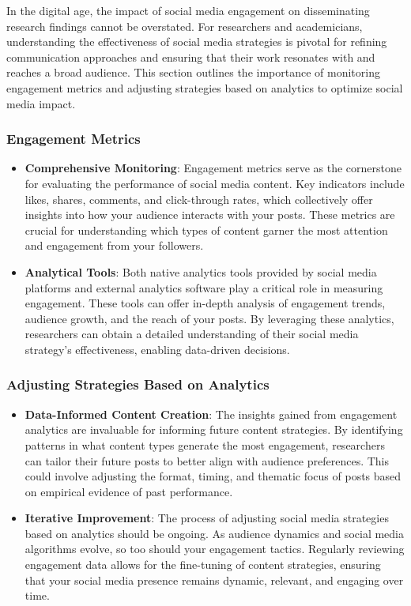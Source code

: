 \documentclass[
]{book}
\begin{document}
In the digital age, the impact of social media engagement on disseminating research findings cannot be overstated. For researchers and academicians, understanding the effectiveness of social media strategies is pivotal for refining communication approaches and ensuring that their work resonates with and reaches a broad audience. This section outlines the importance of monitoring engagement metrics and adjusting strategies based on analytics to optimize social media impact.

\hypertarget{engagement-metrics}{%
\subsubsection{Engagement Metrics}\label{engagement-metrics}}

\begin{itemize}
\item
  \textbf{Comprehensive Monitoring}: Engagement metrics serve as the cornerstone for evaluating the performance of social media content. Key indicators include likes, shares, comments, and click-through rates, which collectively offer insights into how your audience interacts with your posts. These metrics are crucial for understanding which types of content garner the most attention and engagement from your followers.
\item
  \textbf{Analytical Tools}: Both native analytics tools provided by social media platforms and external analytics software play a critical role in measuring engagement. These tools can offer in-depth analysis of engagement trends, audience growth, and the reach of your posts. By leveraging these analytics, researchers can obtain a detailed understanding of their social media strategy's effectiveness, enabling data-driven decisions.
\end{itemize}

\hypertarget{adjusting-strategies-based-on-analytics}{%
\subsubsection{Adjusting Strategies Based on Analytics}\label{adjusting-strategies-based-on-analytics}}

\begin{itemize}
\item
  \textbf{Data-Informed Content Creation}: The insights gained from engagement analytics are invaluable for informing future content strategies. By identifying patterns in what content types generate the most engagement, researchers can tailor their future posts to better align with audience preferences. This could involve adjusting the format, timing, and thematic focus of posts based on empirical evidence of past performance.
\item
  \textbf{Iterative Improvement}: The process of adjusting social media strategies based on analytics should be ongoing. As audience dynamics and social media algorithms evolve, so too should your engagement tactics. Regularly reviewing engagement data allows for the fine-tuning of content strategies, ensuring that your social media presence remains dynamic, relevant, and engaging over time.
\end{itemize}
\end{document}
